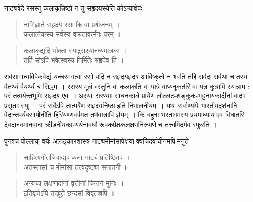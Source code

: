 {\dev नाट्यवेदे रसस्तु कलाकृन्निष्ठो न तु सहृदयस्येति कोऽप्याक्षेपः}
\begin{quote}
{\dev नाभिज्ञाते सहृदये रसः किं वा प्रयोजनम्~।}\\
{\dev कलालोकस्य सर्वस्य वक्रतावर्त्मनः परम् ॥}
\end{quote}
\begin{quote}
{\dev कलाकृद्यदि भोक्ता स्याद्रसस्यानन्यमात्रकः~।}\\
{\dev तर्हि सोऽपि भवेत्स्वस्य निर्मितेः सहृदेव हि ॥}
\end{quote}

{\dev सर्वसामान्यविवेकवेद्यं यच्चरमगत्या रसो यदि न सहृदयहृदय आविष्कृतो न भवति तर्हि सर्वदा सर्वथा च तस्य वैतथ्यं वैयर्थ्यं च सिद्धम्~। रसस्य मूलं वस्तुनि वा कलाकृति वा पात्रे वाप्यनुकर्तरि वा  यत्र कुत्रापि स्यान्नाम ; परं तत्पर्यन्तभूमिः सहृदय एव~। अस्याः सरण्याः साधनकाले प्रायेण लोल्लट-शङ्कुक-भट्टनायकादीनां वादाः प्रसृताः स्युः~। परं सर्वेऽपि तात्पर्येण सहृदयनिष्ठा इति निभालनीयम्~। यथा सर्वाण्यपि भारतीयदर्शनानि वेदान्तपर्यवसायीनीति हिरियण्णवर्यमतं तथैवात्रापि ज्ञेयम्~। किं बहुना भरतागमस्य प्रथमाध्याय एव विधातरि देवदानवमानवानां क्रीडनीयकाभ्यर्थनावधौ रूपकप्रेक्षकलक्षणनिरूपणे च तत्त्वमिदमेव स्फुरति~।}

{\dev पुनश्च पोल्लाक् वर्यः अलङ्कारशास्त्रं नाट्यमीमांसापेक्षया क्वचिदर्वाचीनमपि मनुते}
\begin{quote}
{\dev साहित्यगीतचित्राद्याः कला नाट्ये प्रतिष्ठिताः~।}\\
{\dev अतस्तासां च मीमांसा तत्त्वदृष्ट्या सनातनी ॥}
\end{quote}
\begin{quote}
{\dev अन्यच्च लक्षणादीनां वृत्तीनां चिन्तने मुनिः~।}\\
{\dev इतिवृत्तेऽपि तद्ब्रूते छन्दसां विवृतावपि ॥}
\end{quote}

